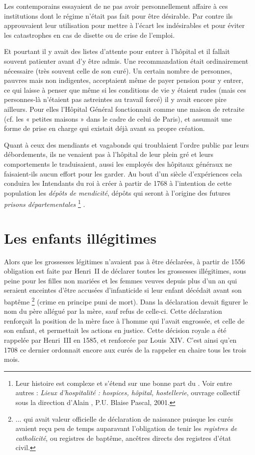  Les contemporains essayaient de ne pas avoir personnellement affaire à ces institutions dont le régime n'était pas fait pour être désirable. Par contre ils approuvaient leur utilisation pour mettre à l'écart les indésirables et pour éviter les catastrophes en cas de disette ou de crise de l'emploi. 

 Et pourtant il y avait des listes d'attente pour entrer à l'hôpital et il fallait souvent patienter avant d'y être admis. Une recommandation était ordinairement nécessaire (très souvent celle de son curé). Un certain nombre de personnes, pauvres mais non indigentes, acceptaient même de payer pension pour y entrer, ce qui laisse à penser que même si les conditions de vie y étaient rudes (mais ces personnes-là n'étaient pas astreintes au travail forcé) il y avait encore pire ailleurs. Pour elles l'Hôpital Général fonctionnait comme une maison de retraite (cf. les « petites maisons » dans le cadre de celui de Paris), et assumait une forme de prise en charge qui existait déjà avant sa propre création.

 Quant à ceux des mendiants et vagabonds qui troublaient l'ordre public par leurs débordements, ils ne venaient pas à l'hôpital de leur plein gré et leurs comportements le traduisaient, aussi les employés des hôpitaux généraux ne faisaient-ils aucun effort pour les garder. Au bout d'un siècle d'expériences cela conduira les Intendants du roi à créer à partir de 1768 à l'intention de cette population les \emph{dépôts de mendicité}, dépôts qui seront à l'origine des futures \emph{prisons départementales}%
\footnote{Leur histoire est complexe et s'étend sur une bonne part du . Voir entre autres : \emph{Lieux d'hospitalité : hospices, hôpital, hostellerie}, ouvrage collectif sous la direction d'Alain , P.U. Blaise Pascal, 2001.}%
.


\section{Les enfants illégitimes}

 Alors que les grossesses légitimes n'avaient pas à être déclarées, à partir de 1556 obligation est faite par Henri~II de déclarer toutes les grossesses illégitimes, sous peine pour les filles non mariées et les femmes veuves depuis plus d'un an qui seraient enceintes d'être accusées d'infanticide si leur enfant décédait avant son baptême%
\footnote{... qui avait valeur officielle de déclaration de naissance puisque les curés avaient reçu peu de temps auparavant l'obligation de tenir les \emph{registres de catholicité}, ou registres de baptême, ancêtres directs des registres d'état civil.} 
(crime en principe puni de mort). Dans la déclaration devait figurer le nom du père allégué par la mère, sauf refus de celle-ci. Cette déclaration renforçait la position de la mère face à l'homme qui l'avait engrossée, et celle de son enfant, et permettait les actions en justice. Cette décision royale a été rappelée par Henri~III en 1585, et renforcée par Louis~XIV. C'est ainsi qu'en 1708 ce dernier ordonnait encore aux curés de la rappeler en chaire tous les trois mois. 

